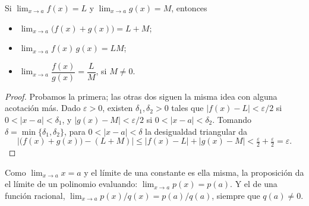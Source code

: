 %

\begin{frame}

\begin{proposition}
Si $\lim_{x \to a} f(x) = L$ y $\lim_{x \to a} g(x) = M$, entonces
\begin{itemize}
  \item $\lim_{x \to a} \bigl(f(x) + g(x)\bigr) = L + M$;
  \item $\lim_{x \to a} f(x)\,g(x) = L M$;
  \item $\lim_{x \to a} \dfrac{f(x)}{g(x)} = \dfrac{L}{M}$, si $M \neq 0$.
\end{itemize}
\end{proposition}

\begin{notesonly}
\begin{proof}
Probamos la primera; las otras dos siguen la misma idea con alguna acotación
más. Dado $\varepsilon > 0$, existen $\delta_1, \delta_2 > 0$ tales que
$|f(x) - L| < \varepsilon/2$ si $0 < |x - a| < \delta_1$, y
$|g(x) - M| < \varepsilon/2$ si $0 < |x - a| < \delta_2$. Tomando
$\delta = \min\{\delta_1, \delta_2\}$, para $0 < |x - a| < \delta$ la
desigualdad triangular da
\[
  \bigl|\bigl(f(x) + g(x)\bigr) - (L + M)\bigr|
  \le |f(x) - L| + |g(x) - M|
  < \tfrac{\varepsilon}{2} + \tfrac{\varepsilon}{2} = \varepsilon .
\]
\end{proof}
\end{notesonly}

\dpause

\begin{remark}
Como $\lim_{x \to a} x = a$ y el límite de una constante es ella misma, la
proposición da el límite de un polinomio evaluando: $\lim_{x \to a} p(x) =
p(a)$. Y el de una función racional, $\lim_{x \to a} p(x)/q(x) = p(a)/q(a)$,
siempre que $q(a) \neq 0$.
\end{remark}

\end{frame}
